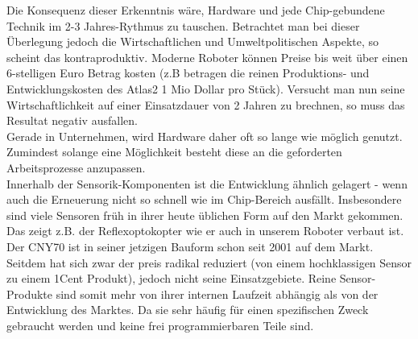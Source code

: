 \documentclass[a4paper,cleardoubleempty,BCOR1cm]{book}
\begin{document}
Die Konsequenz dieser Erkenntnis wäre, Hardware und jede Chip-gebundene Technik im 2-3 Jahres-Rythmus zu tauschen. Betrachtet man bei dieser Überlegung jedoch die Wirtschaftlichen und Umweltpolitischen Aspekte, so scheint das kontraproduktiv. Moderne Roboter können Preise bis weit über einen 6-stelligen Euro Betrag kosten (z.B betragen die reinen Produktions- und Entwicklungskosten des Atlas2 1 Mio Dollar pro Stück). Versucht man nun seine Wirtschaftlichkeit auf einer Einsatzdauer von 2 Jahren zu brechnen, so muss das Resultat negativ ausfallen. \\
Gerade in Unternehmen, wird Hardware daher oft so lange wie möglich genutzt. Zumindest solange eine Möglichkeit besteht diese an die geforderten Arbeitsprozesse anzupassen. \\

Innerhalb der Sensorik-Komponenten ist die Entwicklung ähnlich gelagert - wenn auch die Erneuerung nicht so schnell wie im Chip-Bereich ausfällt. Insbesondere sind viele Sensoren früh in ihrer heute üblichen Form auf den Markt gekommen. Das zeigt z.B. der Reflexoptokopter wie er auch in unserem Roboter verbaut ist. Der CNY70 ist in seiner jetzigen Bauform schon seit 2001 auf dem Markt. Seitdem hat sich zwar der preis radikal reduziert (von einem hochklassigen Sensor zu einem 1Cent Produkt), jedoch nicht seine Einsatzgebiete. Reine Sensor-Produkte sind somit mehr von ihrer internen Laufzeit abhängig als von der Entwicklung des Marktes. Da sie sehr häufig für einen spezifischen Zweck gebraucht werden und keine frei programmierbaren Teile sind. 
\end{document}
